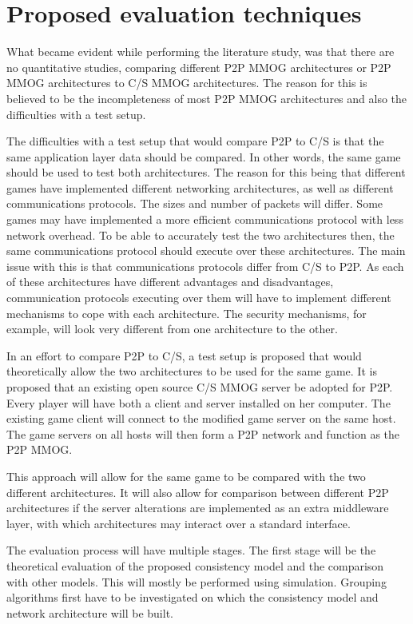 \documentclass[journal,oneside,a4paper,onecolumn]{IEEEtran}
\begin{document}
\section{Proposed evaluation techniques}
\label{evaluation_techniques}

What became evident while performing the literature study, was that there are no quantitative studies, comparing different P2P MMOG architectures or P2P MMOG architectures to C/S MMOG architectures. The reason for this is believed to be the incompleteness of most P2P MMOG architectures and also the difficulties with a test setup.

The difficulties with a test setup that would compare P2P to C/S is that the same application layer data should be compared. In other words, the same game should be used to test both architectures. The reason for this being that different games have implemented different networking architectures, as well as different communications protocols. The sizes and number of packets will differ. Some games may have implemented a more efficient communications protocol with less network overhead. To be able to accurately test the two architectures then, the same communications protocol should execute over these architectures. The main issue with this is that communications protocols differ from C/S to P2P. As each of these architectures have different advantages and disadvantages, communication protocols executing over them will have to implement different mechanisms to cope with each architecture. The security mechanisms, for example, will look very different from one architecture to the other.

In an effort to compare P2P to C/S, a test setup is proposed that would theoretically allow the two architectures to be used for the same game. It is proposed that an existing open source C/S MMOG server be adopted for P2P. Every player will have both a client and server installed on her computer. The existing game client will connect to the modified game server on the same host. The game servers on all hosts will then form a P2P network and function as the P2P MMOG.

This approach will allow for the same game to be compared with the two different architectures. It will also allow for comparison between different P2P architectures if the server alterations are implemented as an extra middleware layer, with which architectures may interact over a standard interface.

The evaluation process will have multiple stages. The first stage will be the theoretical evaluation of the proposed consistency model and the comparison with other models. This will mostly be performed using simulation. Grouping algorithms first have to be investigated on which the consistency model and network architecture will be built.
\end{document}
